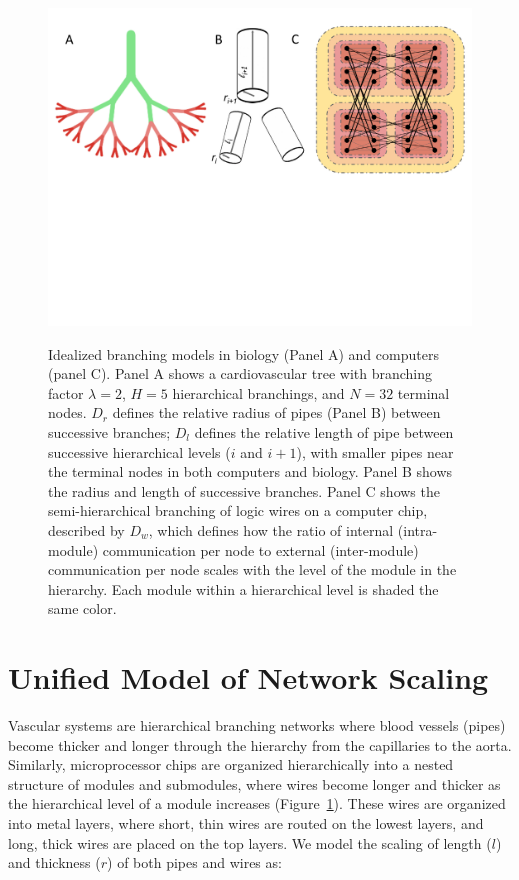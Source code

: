 \documentclass[12pt]{article}
\begin{document}
\begin{figure}[!h]
\centering
\includegraphics[width=\textwidth]{Figures/Figure1Draft3.pdf}
\label{fig:firstfig}

\caption{Idealized branching models in biology (Panel A) and computers
  (panel C). Panel A shows a cardiovascular tree with branching factor $\lambda
  = 2$, $H = 5$ hierarchical branchings, and $N = 32$ terminal
  nodes. $D_r$ defines the relative radius of pipes (Panel B) between
  successive branches; $D_l$ defines the relative length of pipe
  between successive hierarchical levels ($i$ and $i+1$), with smaller pipes near the
  terminal nodes in both computers and biology. Panel B shows the
  radius and length of successive branches. Panel C shows the
  semi-hierarchical branching of logic wires on a computer chip,
  described by $D_w$, which
  defines how the ratio of internal (intra-module) communication per
  node to external (inter-module) communication per node scales with
  the level of the module in the hierarchy. Each module within a
  hierarchical level is shaded the same color.}

\end{figure}
\section{Unified Model of Network Scaling}
\label{sec:unified-model}


Vascular systems are hierarchical branching networks where blood vessels
(pipes) become thicker and longer through the hierarchy from the capillaries
to the aorta. Similarly, microprocessor chips are organized hierarchically into
a nested structure of modules and submodules, where wires become longer and
thicker as the hierarchical level of a module increases
(Figure~\ref{fig:firstfig}).  These wires are organized into metal
layers, where short, thin wires are routed on the lowest layers, and long,
thick wires are placed on the top layers. We model the scaling of length ($l$)
and thickness ($r$) of both pipes and wires as:
\end{document}
